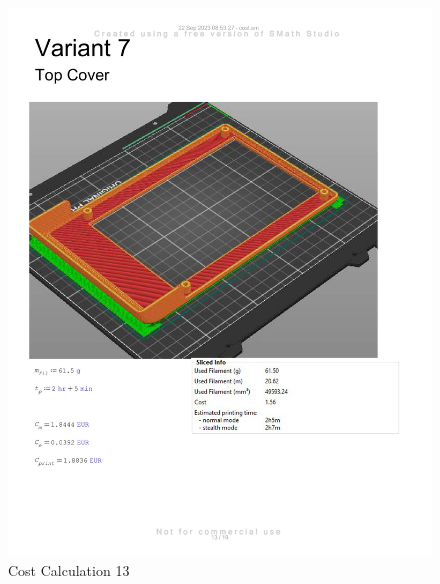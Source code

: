 \begin{figure}[H]
    \centering
    \includegraphics[width=\linewidth]{texs/appendix/data/costcalculation/cost1-13.jpg}
    \caption{Cost Calculation 13}
    \label{fig:cost-calculation-13}
\end{figure}

